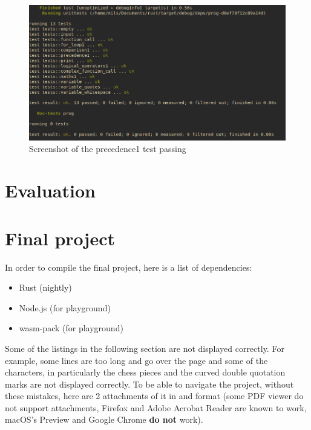 \documentclass{article}
\begin{document}
\begin{figure}
	\includegraphics[width=\textwidth]{precedence_test_pass}
	\caption{Screenshot of the precedence1 test passing}
	\label{fig:precedence_test_pass}
\end{figure}

\section{Evaluation}


\section{Final project}
\label{sec:final_project}

In order to compile the final project, here is a list of dependencies:

\begin{itemize}
	\item Rust (nightly)
	\item Node.js (for playground)
	\item wasm-pack (for playground)
\end{itemize}

Some of the listings in the following section are not displayed correctly. For
example, some lines are too long and go over the page and some of the
characters, in particularly the chess pieces and the curved double quotation
marks are not displayed correctly. To be able to navigate the project, without
these mistakes, here are 2 attachments of it in
 and
 format (some PDF viewer do not
support attachments, Firefox and Adobe Acrobat Reader are known to work,
macOS's Preview and Google Chrome \textbf{do not} work).
\end{document}
